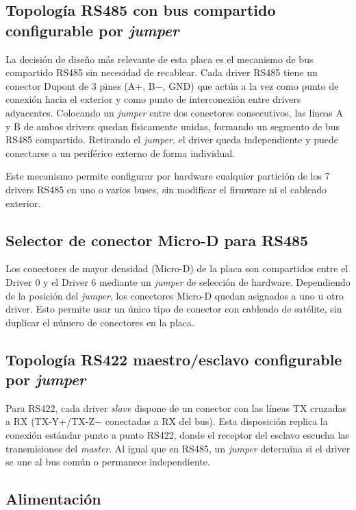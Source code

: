 \subsection{Topología RS485 con bus compartido configurable por \textit{jumper}}

La decisión de diseño más relevante de esta placa es el mecanismo de bus compartido RS485
sin necesidad de recablear. Cada driver RS485 tiene un conector Dupont de 3 pines
(A+, B$-$, GND) que actúa a la vez como punto de conexión hacia el exterior y como punto de
interconexión entre drivers adyacentes. Colocando un \textit{jumper} entre dos conectores
consecutivos, las líneas A y B de ambos drivers quedan físicamente unidas, formando un
segmento de bus RS485 compartido. Retirando el \textit{jumper}, el driver queda independiente y
puede conectarse a un periférico externo de forma individual.

Este mecanismo permite configurar por hardware cualquier partición de los 7 drivers RS485
en uno o varios buses, sin modificar el firmware ni el cableado exterior.

\subsection{Selector de conector Micro-D para RS485}

Los conectores de mayor densidad (Micro-D) de la placa son compartidos entre el Driver 0 y
el Driver 6 mediante un \textit{jumper} de selección de hardware. Dependiendo de la posición del
\textit{jumper}, los conectores Micro-D quedan asignados a uno u otro driver. Esto permite usar
un único tipo de conector con cableado de satélite, sin duplicar el número de conectores en
la placa.

\subsection{Topología RS422 maestro/esclavo configurable por \textit{jumper}}

Para RS422, cada driver \textit{slave} dispone de un conector con las líneas TX cruzadas a RX
(TX-Y+/TX-Z$-$ conectadas a RX del bus). Esta disposición replica la conexión estándar punto a
punto RS422, donde el receptor del esclavo escucha las transmisiones del \textit{master}. Al
igual que en RS485, un \textit{jumper} determina si el driver se une al bus común o permanece
independiente.

\subsection{Alimentación}

